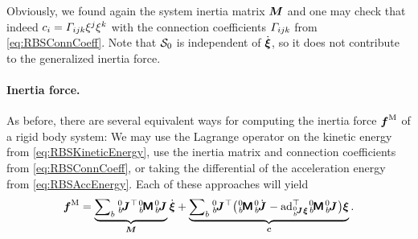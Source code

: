 Obviously, we found again the system inertia matrix $\boldsymbol{M}$ and one may check that indeed $c_{i} = \varGamma_{ijk} \xi^{j} \xi^{k}$ with the connection coefficients $\varGamma_{ijk}$ from \eqref{eq:RBSConnCoeff}.
Note that $\mathcal{S}_0$ is independent of $\dot{\boldsymbol{\xi}}$, so it does not contribute to the generalized inertia force.

\paragraph{Inertia force.}
As before, there are several equivalent ways for computing the inertia force $\boldsymbol{f}^{\mathrm{M}}$ of a rigid body system:
We may use the Lagrange operator on the kinetic energy from \eqref{eq:RBSKineticEnergy}, use the inertia matrix and connection coefficients from \eqref{eq:RBSConnCoeff}, or taking the differential of the acceleration energy from \eqref{eq:RBSAccEnergy}.
Each of these approaches will yield
\begin{align}\label{eq:RBSInertiaForce}
 \genForceInertia 
 = \underbrace{\sumBodies \bodyJac{0}{\BidxII}^\top \bodyInertiaMat{0}{\BidxII} \bodyJac{0}{\BidxII}}_{\sysInertiaMat} \sysVeld
 + \underbrace{\sumBodies \bodyJac{0}{\BidxII}^\top \big(\bodyInertiaMat{0}{\BidxII} \bodyJacd{0}{\BidxII} - \ad{\bodyJac{0}{\BidxII}\sysVel}^\top \bodyInertiaMat{0}{\BidxII}\bodyJac{0}{\BidxII} \big) \sysVel}_{\gyroForce}.
\end{align}
